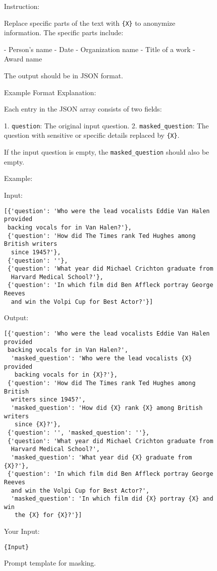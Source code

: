 \onecolumn

\begin{figure}[ht]
\begin{tcolorbox}[width=0.9\textwidth, colback=white, colframe=black, boxsep=5pt, fontupper=\small]
Instruction:

Replace specific parts of the text with \verb|{X}| to anonymize information. The specific parts include:

- Person's name
- Date
- Organization name
- Title of a work
- Award name

The output should be in JSON format.

Example Format Explanation:

Each entry in the JSON array consists of two fields:

1. \texttt{question}: The original input question.
2. \texttt{masked\_question}: The question with sensitive or specific details replaced by \verb|{X}|.

If the input question is empty, the \texttt{masked\_question} should also be empty.

Example:

Input:

\begin{verbatim}
[{'question': 'Who were the lead vocalists Eddie Van Halen provided
 backing vocals for in Van Halen?'},
 {'question': 'How did The Times rank Ted Hughes among British writers
  since 1945?'},
 {'question': ''},
 {'question': 'What year did Michael Crichton graduate from
  Harvard Medical School?'},
 {'question': 'In which film did Ben Affleck portray George Reeves
  and win the Volpi Cup for Best Actor?'}]
\end{verbatim}

Output:

\begin{verbatim}
[{'question': 'Who were the lead vocalists Eddie Van Halen provided
 backing vocals for in Van Halen?',
  'masked_question': 'Who were the lead vocalists {X} provided
   backing vocals for in {X}?'},
 {'question': 'How did The Times rank Ted Hughes among British
  writers since 1945?',
  'masked_question': 'How did {X} rank {X} among British writers
   since {X}?'},
 {'question': '', 'masked_question': ''},
 {'question': 'What year did Michael Crichton graduate from
  Harvard Medical School?',
  'masked_question': 'What year did {X} graduate from {X}?'},
 {'question': 'In which film did Ben Affleck portray George Reeves
  and win the Volpi Cup for Best Actor?',
  'masked_question': 'In which film did {X} portray {X} and win
   the {X} for {X}?'}]
\end{verbatim}

Your Input:

\verb|{Input}|
\end{tcolorbox}
\caption{Prompt template for masking.}
\end{figure}
\twocolumn